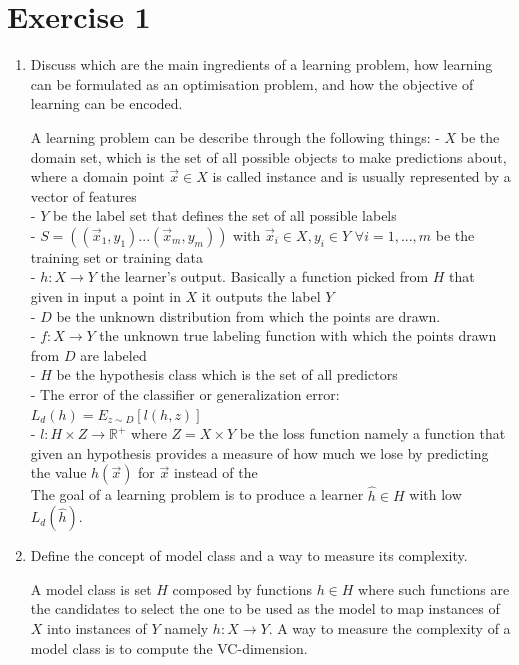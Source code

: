 \documentclass[a4paper,11pt,oneside]{book}
\begin{document}
\section{Exercise 1}
    \begin{enumerate}
        \item Discuss which are the main ingredients of a learning problem, how learning can be formulated as an optimisation problem, and how the objective of learning can be encoded.
            \begin{solution}
                A learning problem can be describe through the following things:
                - $X$ be the domain set, which is the set of all possible objects to make predictions about, where a domain point $\vec{x} \in X$ is called instance and is usually represented by a vector of features \\
                - $Y$ be the label set that defines the set of all possible labels  \\
                - $S = ((\vec{x}_1,y_1) ... (\vec{x}_m,y_m))$ with $\vec{x}_i \in X, y_i \in Y$ $\forall i = 1,...,m$ be the training set or training data\\
                - $h: X \to Y$ the learner's output. Basically a function picked from $H$ that given in input a point in $X$ it outputs the label $Y$\\
                - $D$ be the unknown distribution from which the points are drawn.\\
                - $f: X \to Y$ the unknown true labeling function with which the points drawn from $D$ are labeled\\
                - $H$ be the hypothesis class which is the set of all predictors\\
                - The error of the classifier or generalization error: $L_d(h) = E_{z\sim D}[l(h,z)]$\\
                - $l: H\times Z \to \mathbb{R}^+$ where $Z = X\times Y$ be the loss function namely a function that given an hypothesis provides a measure of how much we lose by predicting the value $h(\vec{x})$ for $\vec{x}$ instead of the\\
                
                The goal of a learning problem is to produce a learner $\hat{h} \in H$ with low $L_d(\hat{h})$.
            \end{solution}
        \item Define the concept of model class and a way to measure its complexity.
            \begin{solution}
                A model class is set $H$ composed by functions $h \in H$ where such functions are the candidates to select the one to be used as the model to map instances of $X$ into instances of $Y$ namely $h: X \to Y$. A way to measure the complexity of a model class is to compute the VC-dimension.
                

\end{solution}
\end{enumerate}
\end{document}

